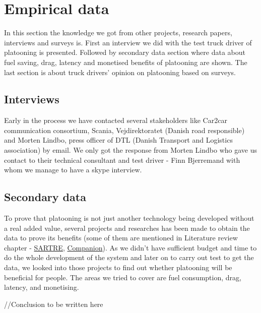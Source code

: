 \section{Empirical data}\label{sec:data}
% 
In this section the knowledge we got from other projects, research papers, interviews and surveys is. First an interview we did with the test truck driver of platooning is presented. Followed by secondary data section where data about fuel saving, drag, latency and monetised benefits of platooning are shown. The last section is about truck drivers' opinion on platooning based on surveys.
% 
\subsection{Interviews}
% 
Early in the process we have contacted several stakeholders like Car2car communication consortium, Scania, Vejdirektoratet (Danish road responsible) and Morten Lindbo, press officer of DTL (Danish Transport and Logistics association) by email. We only got the response from Morten Lindbo who gave us contact to their technical consultant and test driver - Finn Bjerremand with whom we manage to have a skype interview.
% 

% 
\subsection{Secondary data}
% 
To prove that platooning is not just another technology being developed without a real added value, several projects and researches has been made to obtain the data to prove its benefits (some of them are mentioned in Literature review chapter - \hyperref[sec:SARTRE]{SARTRE}, \hyperref[sec:Companion]{Companion}). As we didn’t have sufficient budget and time to do the whole development of the system and later on to carry out test to get the data, we looked into those projects to find out whether platooning will be beneficial for people. The areas we tried to cover are fuel consumption, drag, latency, and monetising.
% 

% 

% 

% 

% 
//Conclusion to be written here
